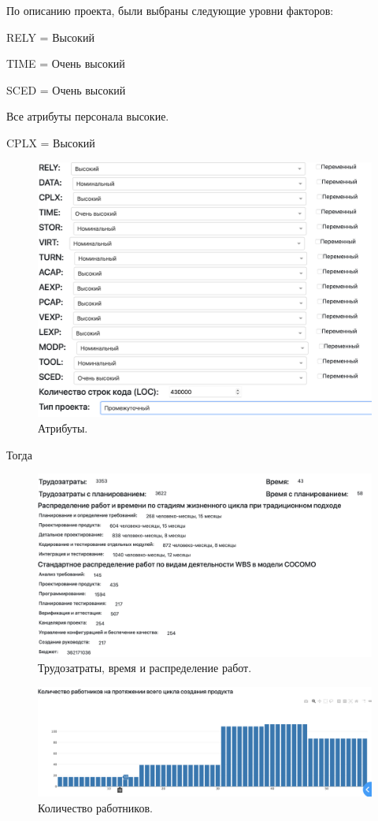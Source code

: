 \documentclass[a4paper,14pt]{extreport} %
\begin{document}
\begin{enumerate}
По описанию проекта, были выбраны следующие уровни факторов:

RELY = Высокий

TIME = Очень высокий

SCED = Очень высокий

Все атрибуты персонала высокие.

CPLX = Высокий

\begin{figure}[H]
  \centering
  \caption{Атрибуты. }
  \includegraphics[scale=0.5]{table2}
\end{figure}

Тогда

\begin{figure}[H]
  \centering
  \caption{Трудозатраты, время и распределение работ. }
  \includegraphics[scale=0.4]{project}
\end{figure}

\begin{figure}[H]
  \centering
  \caption{Количество работников. }
  \includegraphics[scale=0.4]{count}
\end{figure}


\end{enumerate}
\end{document}
